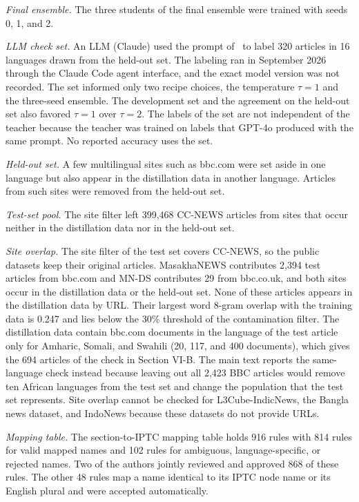\documentclass[journal,onecolumn]{IEEEtran}
\begin{document}
\textit{Final ensemble.} The three students of the final ensemble were trained with seeds 0, 1, and 2.

\textit{LLM check set.} An LLM (Claude) used the prompt of~\cite{kuzman2025llm} to label 320 articles in 16 languages drawn from the held-out set. The labeling ran in September 2026 through the Claude Code agent interface, and the exact model version was not recorded. The set informed only two recipe choices, the temperature $\tau=1$ and the three-seed ensemble. The development set and the agreement on the held-out set also favored $\tau=1$ over $\tau=2$. The labels of the set are not independent of the teacher because the teacher was trained on labels that GPT-4o produced with the same prompt. No reported accuracy uses the set.

\textit{Held-out set.} A few multilingual sites such as bbc.com were set aside in one language but also appear in the distillation data in another language. Articles from such sites were removed from the held-out set.

\textit{Test-set pool.} The site filter left 399,468 CC-NEWS articles from sites that occur neither in the distillation data nor in the held-out set.

\textit{Site overlap.} The site filter of the test set covers CC-NEWS, so the public datasets keep their original articles. MasakhaNEWS contributes 2,394 test articles from bbc.com and MN-DS contributes 29 from bbc.co.uk, and both sites occur in the distillation data or the held-out set. None of these articles appears in the distillation data by URL. Their largest word 8-gram overlap with the training data is 0.247 and lies below the 30\% threshold of the contamination filter. The distillation data contain bbc.com documents in the language of the test article only for Amharic, Somali, and Swahili (20, 117, and 400 documents), which gives the 694 articles of the check in Section VI-B. The main text reports the same-language check instead because leaving out all 2,423 BBC articles would remove ten African languages from the test set and change the population that the test set represents. Site overlap cannot be checked for L3Cube-IndicNews, the Bangla news dataset, and IndoNews because these datasets do not provide URLs.

\textit{Mapping table.} The section-to-IPTC mapping table holds 916 rules with 814 rules for valid mapped names and 102 rules for ambiguous, language-specific, or rejected names. Two of the authors jointly reviewed and approved 868 of these rules. The other 48 rules map a name identical to its IPTC node name or its English plural and were accepted automatically.
\end{document}
